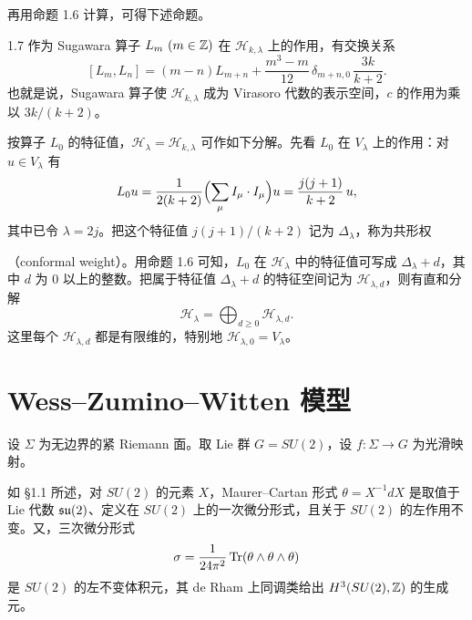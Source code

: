 再用命题 1.6 计算，可得下述命题。

\begin{proposition}{1.7}
作为 Sugawara 算子 $L_m\ (m\in\Z)$ 在 $\mathcal{H}_{k,\lambda}$ 上的作用，有交换关系
\[
  [L_m,L_n]=(m-n)L_{m+n}+\frac{m^3-m}{12}\,\delta_{m+n,0}\,\frac{3k}{k+2}.
\]
也就是说，Sugawara 算子使 $\mathcal{H}_{k,\lambda}$ 成为 Virasoro 代数的表示空间，$c$ 的作用为乘以 $3k/(k+2)$。
\end{proposition}


按算子 $L_0$ 的特征值，$\mathcal{H}_\lambda=\mathcal{H}_{k,\lambda}$ 可作如下分解。先看 $L_0$ 在 $V_\lambda$ 上的作用：对 $u\in V_\lambda$ 有
\[
  L_0u=\frac{1}{2(k+2)}\Bigl(\sum_\mu I_\mu\cdot I_\mu\Bigr)u=\frac{j(j+1)}{k+2}\,u,
\]
其中已令 $\lambda=2j$。把这个特征值 $j(j+1)/(k+2)$ 记为 $\Delta_\lambda$，称为共形权

（conformal weight）。用命题 1.6 可知，$L_0$ 在 $\mathcal{H}_\lambda$ 中的特征值可写成 $\Delta_\lambda+d$，其中 $d$ 为 $0$ 以上的整数。把属于特征值 $\Delta_\lambda+d$ 的特征空间记为 $\mathcal{H}_{\lambda,d}$，则有直和分解
\begin{equation}
  \mathcal{H}_\lambda=\bigoplus_{d\ge0}\mathcal{H}_{\lambda,d}. \tag{1.11}
\end{equation}
这里每个 $\mathcal{H}_{\lambda,d}$ 都是有限维的，特别地 $\mathcal{H}_{\lambda,0}=V_\lambda$。

\section{Wess--Zumino--Witten 模型}


设 $\Sigma$ 为无边界的紧 Riemann 面。取 Lie 群 $G=SU(2)$，设 $f:\Sigma\to G$ 为光滑映射。

如 §1.1 所述，对 $SU(2)$ 的元素 $X$，Maurer--Cartan 形式 $\theta=X^{-1}dX$ 是取值于 Lie 代数 $\mathfrak{su}(2)$、定义在 $SU(2)$ 上的一次微分形式，且关于 $SU(2)$ 的左作用不变。又，三次微分形式
\[
  \sigma=\frac{1}{24\pi^2}\operatorname{Tr}(\theta\wedge\theta\wedge\theta)
\]
是 $SU(2)$ 的左不变体积元，其 de Rham 上同调类给出 $H^3(SU(2),\mathbb{Z})$ 的生成元。

